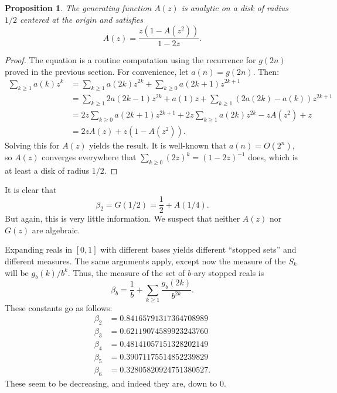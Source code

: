 \documentclass[12pt]{amsart}
\newtheorem{proposition}{Proposition}
\theoremstyle{definition}
\begin{document}
\begin{proposition}
    The generating function $A(z)$ is analytic on a disk of radius $1 / 2$
    centered at the origin and satisfies
    \begin{equation*}
        A(z) = \frac{z(1 - A(z^2))}{1 - 2z}.
    \end{equation*}
\end{proposition}

\begin{proof}
    The equation is a routine computation using the recurrence for $g(2n)$ proved in
    the previous section. For convenience, let $a(n) = g(2n)$. Then:
    \begin{align*}
        \sum_{k \geq 1} a(k) z^k
            &= \sum_{k \geq 1} a(2k) z^{2k} + \sum_{k \geq 0} a(2k + 1) z^{2k + 1} \\
            &= \sum_{k \geq 1} 2 a(2k - 1) z^{2k} + a(1) z + \sum_{k \geq 1} (2a(2k) - a(k)) z^{2k + 1} \\
            &= 2 z \sum_{k \geq 0} a(2k + 1) z^{2k + 1} + 2 z \sum_{k \geq 1} a(2k) z^{2k} - z A(z^2) + z \\
            &= 2z A(z) + z(1 - A(z^2)).
    \end{align*}
    Solving this for $A(z)$ yields the result. It is well-known that $a(n) =
    O(2^n)$, so $A(z)$ converges everywhere that $\sum_{k \geq 0} (2z)^k = (1 -
    2z)^{-1}$ does, which is at least a disk of radius $1/2$.
\end{proof}

It is clear that
\begin{equation*}
    \beta_2 = G(1/2) =\frac{1}{2} + A(1/4).
\end{equation*}
But again, this is very little information. We suspect that neither $A(z)$ nor
$G(z)$ are algebraic.

Expanding reals in $[0, 1]$ with different bases yields different ``stopped
sets'' and different measures. The same arguments apply, except now the measure
of the $S_k$ will be $g_b(k) / b^k$. Thus, the measure of the set of $b$-ary
stopped reals is
\begin{equation*}
    \beta_b = \frac{1}{b} + \sum_{k \geq 1} \frac{g_b(2k)}{b^{2k}}.
\end{equation*}
These constants go as follows:
\begin{align*}
    \beta_2 &= 0.84165791317364708989 \\
    \beta_3 &= 0.62119074589923243760 \\
    \beta_4 &= 0.48141057151328202149 \\
    \beta_5 &= 0.39071175514852239829 \\
    \beta_6 &= 0.32805820924751380527.
\end{align*}
These seem to be decreasing, and indeed they are, down to 0.
\end{document}
